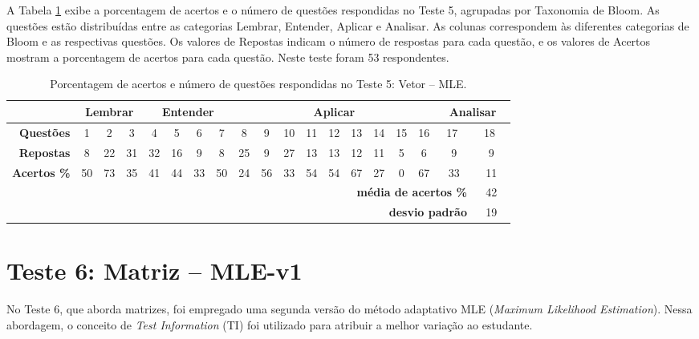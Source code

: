 A Tabela \ref{tab:respostas_atualizada_teste5} exibe a porcentagem de acertos e o número de questões respondidas no Teste 5, agrupadas por Taxonomia de Bloom. As questões estão distribuídas entre as categorias Lembrar, Entender, Aplicar e Analisar. As colunas correspondem às diferentes categorias de Bloom e as respectivas questões. Os valores de Repostas indicam o número de respostas para cada questão, e os valores de Acertos mostram a porcentagem de acertos para cada questão. Neste teste foram 53 respondentes.


\begin{table}[htbp]
    \centering
    \caption{Porcentagem de acertos e número de questões respondidas no Teste 5: Vetor -- MLE.}
    \label{tab:respostas_atualizada_teste5}
    \setlength{\tabcolsep}{4.7pt} %
    \begin{tabular}{|r|*{18}{c|}}
        \hline
        \multicolumn{1}{|l|}{} & \multicolumn{3}{c|}{\cellcolor{green!25}\textbf{Lembrar}} & \multicolumn{4}{c|}{\cellcolor{yellow!25}\textbf{Entender}} & \multicolumn{9}{c|}{\cellcolor{red!25}\textbf{Aplicar}} & \multicolumn{2}{c|}{\cellcolor{blue!25}\textbf{Analisar}} \\ \hline
        \rowcolor[HTML]{D9D9D9} 
        \textbf{Questões} & 1 & 2 & 3 & 4 & 5 & 6 & 7 & 8 & 9 & 10 & 11 & 12 & 13 & 14 & 15 & 16 & \  17 \ & \  18 \   \\
        \textbf{Repostas} & 8 & 22 & 31 & 32 & 16 & 9 & 8 & 25 & 9 & 27 & 13 & 13 & 12 & 11 & 5 & 6 & 9 & 9 \\
        \rowcolor[HTML]{D9D9D9} 
        \textbf{Acertos \%} & 50 & 73 & 35 & 41 & 44 & 33 & 50 & 24 & 56 & 33 & 54 & 54 & 67 & 27 & 0 & 67 & 33 & 11 \\ \hline
        \multicolumn{13}{r}{} & \multicolumn{5}{r}{\cellcolor[HTML]{F9CB9C}\textbf{média de acertos \%}} & \multicolumn{1}{c}{\cellcolor[HTML]{F9CB9C}42} \\ 
        \multicolumn{13}{r}{} & \multicolumn{5}{r}{\cellcolor[HTML]{F9CB9C}\textbf{desvio padrão}} & \multicolumn{1}{c}{\cellcolor[HTML]{F9CB9C}19} \\ 
    \end{tabular}
\end{table}


\section{Teste 6: Matriz -- MLE-v1}

No Teste 6, que aborda matrizes, foi empregado uma segunda versão do método adaptativo MLE (\textit{Maximum Likelihood Estimation}). Nessa abordagem, o conceito de \textit{Test Information} (TI) foi utilizado para atribuir a melhor variação ao estudante. 


